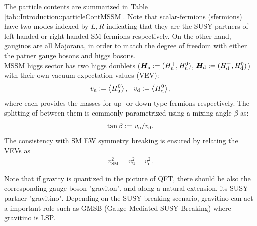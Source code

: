 The particle contents are summarized in Table \ref{tab::Introduction::particleContMSSM}. Note that scalar-fermions (sfermions) have two modes indexed by $L,R$ indicating that they are the SUSY partners of left-handed or right-handed SM fermions respectively. On the other hand, gauginos are all Majorana, in order to match the degree of freedom with either the patner gauge bosons and higgs bosons. \\

MSSM higgs sector has two higgs doublets ($\bm{H}_{\mathrm{u}} := (H_{\mathrm{u}}^+,H_{\mathrm{u}}^0)$, $\bm{H}_{\mathrm{d}} := (H_{\mathrm{d}}^-,H_{\mathrm{d}}^0)$) with their own vacuum expectation values (VEV):
\begin{align}
 v_{\mathrm{u}} :=  \left< H^0_{\mathrm{u}} \right>, \,\,\,\,  v_{\mathrm{d}} :=  \left< H^0_{\mathrm{d}} \right>, \nonumber
\end{align}
where each provides the masses for up- or down-type fermions respectively. The splitting of between them is commonly parametrized using a mixing angle $\beta$ as:
\begin{align}
\tan\beta := v_{\mathrm{u}}/v_{\mathrm{d}}.
\end{align}
The consistency with SM EW symmetry breaking is ensured by relating the VEVs as 
\begin{align}
v^2_{\mathrm{SM}} = v^2_{\mathrm{u}} = v^2_{\mathrm{d}}.
\end{align}

Note that if gravity is quantized in the picture of QFT, there should be also the corresponding gauge boson "graviton", and along a natural extension, its SUSY partner "gravitino". Depending on the SUSY breaking scenario, gravitino can act a important role such as GMSB (Gauge Mediated SUSY Breaking) where gravitino is LSP. \\


